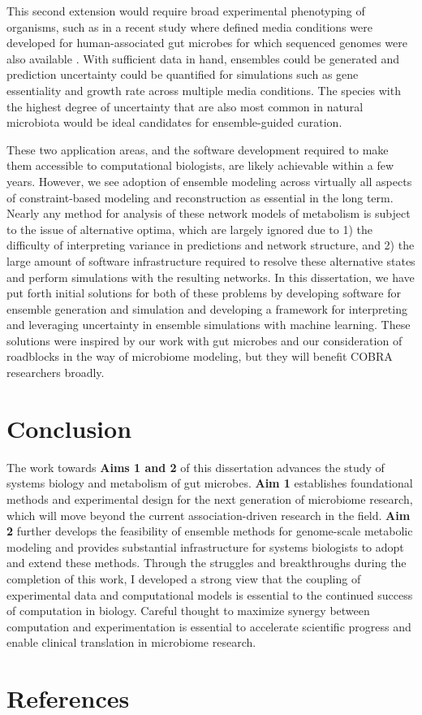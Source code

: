 \documentclass[11pt,onecolumn,notitlepage,openany,twoside]{book}
\begin{document}
\begin{refsection}
This second extension would require broad experimental phenotyping of organisms, such as in a recent study where defined media conditions were developed for human-associated gut microbes for which sequenced genomes were also available \cite{Tramontano2018-xz}. With sufficient data in hand, ensembles could be generated and prediction uncertainty could be quantified for simulations such as gene essentiality and growth rate across multiple media conditions. The species with the highest degree of uncertainty that are also most common in natural microbiota would be ideal candidates for ensemble-guided curation.

These two application areas, and the software development required to make them accessible to computational biologists, are likely achievable within a few years. However, we see adoption of ensemble modeling across virtually all aspects of constraint-based modeling and reconstruction as essential in the long term. Nearly any method for analysis of these network models of metabolism is subject to the issue of alternative optima, which are largely ignored due to 1) the difficulty of interpreting variance in predictions and network structure, and 2) the large amount of software infrastructure required to resolve these alternative states and perform simulations with the resulting networks. In this dissertation, we have put forth initial solutions for both of these problems by developing software for ensemble generation and simulation and developing a framework for interpreting and leveraging uncertainty in ensemble simulations with machine learning. These solutions were inspired by our work with gut microbes and our consideration of roadblocks in the way of microbiome modeling, but they will benefit COBRA researchers broadly.

\section{Conclusion}

The work towards \textbf{Aims 1 and 2} of this dissertation advances the study of systems biology and metabolism of gut microbes. \textbf{Aim 1} establishes foundational methods and experimental design for the next generation of microbiome research, which will move beyond the current association-driven research in the field. \textbf{Aim 2} further develops the feasibility of ensemble methods for genome-scale metabolic modeling and provides substantial infrastructure for systems biologists to adopt and extend these methods. Through the struggles and breakthroughs during the completion of this work, I developed a strong view that the coupling of experimental data and computational models is essential to the continued success of computation in biology. Careful thought to maximize synergy between computation and experimentation is essential to accelerate scientific progress and enable clinical translation in microbiome research.

\section{References}

\printbibliography[heading=none]
\end{refsection}
\end{document}
